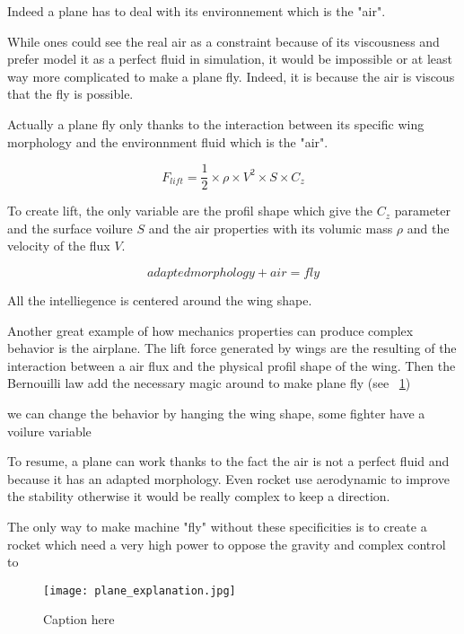 Indeed a plane has to deal with its environnement which is the "air".

While ones could see the real air as a constraint because of its viscousness and prefer model it as a perfect fluid in simulation, it would be impossible or at least way more complicated to make a plane fly. Indeed, it is because the air is viscous that the fly is possible.

Actually a plane fly only thanks to the interaction between its specific wing morphology and the environnment fluid which is the "air".

\begin{equation}
    F_{lift} = \frac12 \times \rho \times V^2\times S \times C_z
\end{equation}

To create lift, the only variable are the profil shape which give the $C_z$ parameter and the surface voilure $S$ and the air properties with its volumic mass $\rho$ and the velocity of the flux $V$.

\begin{equation}
    adapted morphology + air = fly
\end{equation}


All the intelliegence is centered around the wing shape.


Another great example of how mechanics properties can produce complex behavior is the airplane.
The lift force generated by wings are the resulting of the interaction between a air flux and the physical profil shape of the wing.
Then the Bernouilli law add the necessary magic around to make plane fly (see \figurename~\ref{fig:magic_plane})

we can change the behavior by hanging the wing shape, some fighter have a voilure variable

To resume, a plane can work thanks to the fact the air is not a perfect fluid and because it has an adapted morphology. Even rocket use aerodynamic to improve the stability otherwise it would be really complex to keep a direction.



The only way to make machine "fly" without these specificities is to create a rocket which need a very high power to oppose the gravity and complex control to

\begin{figure}[tb]
    \begin{center}
        \texttt{[image: plane\_explanation.jpg]}
    \end{center}
    \caption{Caption here}
    \label{fig:magic_plane}
\end{figure}

